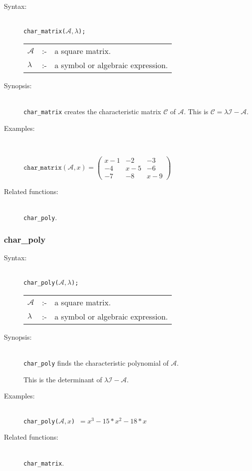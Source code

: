 \begin{description}
\item[Syntax:]\mbox{}\\
\texttt{char\_matrix($\mathcal{A},\lambda$);}\\[2mm]
\begin{tabular}{l l l}
$\mathcal{A}$ &:-& a square matrix. \\
$\lambda$  &:-& a symbol or algebraic expression. 
\end{tabular}

\item[Synopsis:]\mbox{}\\
\texttt{char\_matrix} creates the characteristic matrix $\mathcal{C}$ of 
$\mathcal{A}$.  This is $\mathcal{C} = \lambda \mathcal{I} - \mathcal{A}$. 

\item[Examples:]\mbox{}\\
\begin{flushleft}  
\begin{math}  
\texttt{char\_matrix}(\mathcal{A},x) = 
\begin{pmatrix} x-1 & -2 & -3 \\ -4 & x-5 & -6 \\ -7 & -8 & x-9 \end{pmatrix}  
\end{math}  
\end{flushleft}

\item[Related functions:]\mbox{}\\
\texttt{char\_poly}. 
\end{description}


\subsubsection{char\_poly}
\label{linalg:char_poly}

\begin{description}
\item[Syntax:]\mbox{}\\
\texttt{char\_poly($\mathcal{A},\lambda$);}\\[2mm]
\begin{tabular}{l l l}
$\mathcal{A}$ &:-& a square matrix. \\
$\lambda$ &:-& a symbol or algebraic expression.
\end{tabular}

\item[Synopsis:]\mbox{}\\
\texttt{char\_poly} finds the characteristic polynomial of
                $\mathcal{A}$.  

This is the determinant of $\lambda \mathcal{I} - \mathcal{A}$.

\item[Examples:]\mbox{}\\
\texttt{char\_poly($\mathcal{A},x$) $= x^3-15*x^2-18*x$} 

\item[Related functions:]\mbox{}\\
 \texttt{char\_matrix}. 
\end{description}


